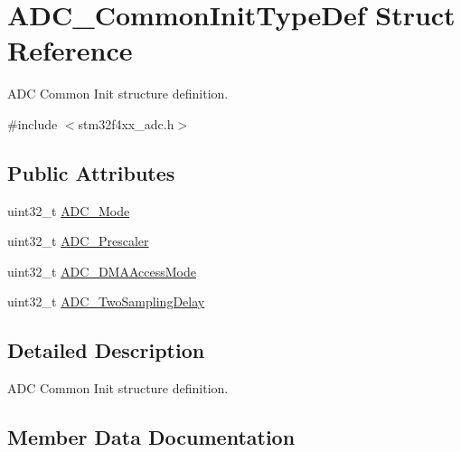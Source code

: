 \hypertarget{struct_a_d_c___common_init_type_def}{}\section{A\+D\+C\+\_\+\+Common\+Init\+Type\+Def Struct Reference}
\label{struct_a_d_c___common_init_type_def}


A\+D\+C Common Init structure definition.  




{\ttfamily \#include $<$stm32f4xx\+\_\+adc.\+h$>$}

\subsection*{Public Attributes}
\begin{DoxyCompactItemize}
\item 
uint32\+\_\+t \hyperlink{struct_a_d_c___common_init_type_def_a9ac2a96e9bbbec4b680ab250051a7b54}{A\+D\+C\+\_\+\+Mode}
\item 
uint32\+\_\+t \hyperlink{struct_a_d_c___common_init_type_def_a4b968331be8f4a43ef31c18f4422df4b}{A\+D\+C\+\_\+\+Prescaler}
\item 
uint32\+\_\+t \hyperlink{struct_a_d_c___common_init_type_def_a421063e29be85798195ea5f2e6c26fbd}{A\+D\+C\+\_\+\+D\+M\+A\+Access\+Mode}
\item 
uint32\+\_\+t \hyperlink{struct_a_d_c___common_init_type_def_a2828abd59ed1777ae66c642d89be410e}{A\+D\+C\+\_\+\+Two\+Sampling\+Delay}
\end{DoxyCompactItemize}


\subsection{Detailed Description}
A\+D\+C Common Init structure definition. 

\subsection{Member Data Documentation}
\hypertarget{struct_a_d_c___common_init_type_def_a421063e29be85798195ea5f2e6c26fbd}{}

